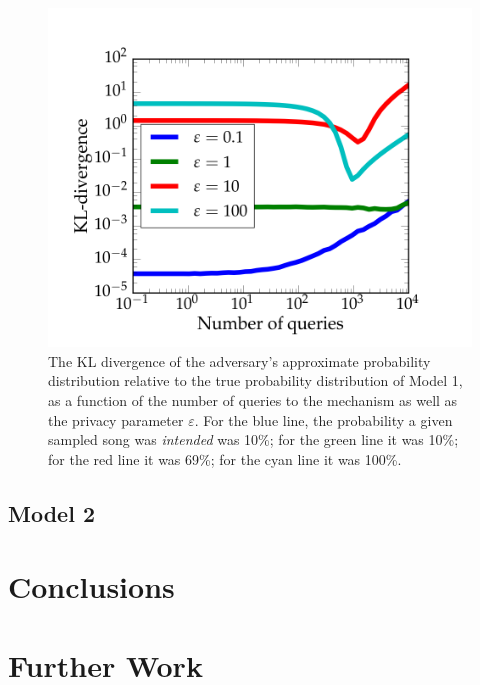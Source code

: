 \documentclass[preprint2]{aastex}
\begin{document}
\begin{figure}[H]
\vspace{-0.24cm}
\centering
\hspace*{-0.5cm}\includegraphics[width=1.2\textwidth]{model1_KL.png}
\caption{The KL divergence of the adversary's approximate probability distribution relative to the true probability distribution of Model 1, as a function of the number of queries to the mechanism as well as the privacy parameter \(\varepsilon\). For the blue line, the probability a given sampled song was \emph{intended} was 10\%; for the green line it was 10\%; for the red line it was 69\%; for the cyan line it was 100\%.}
\end{figure}

\subsection{Model 2}

\section{Conclusions}

\section{Further Work}


\end{document}
